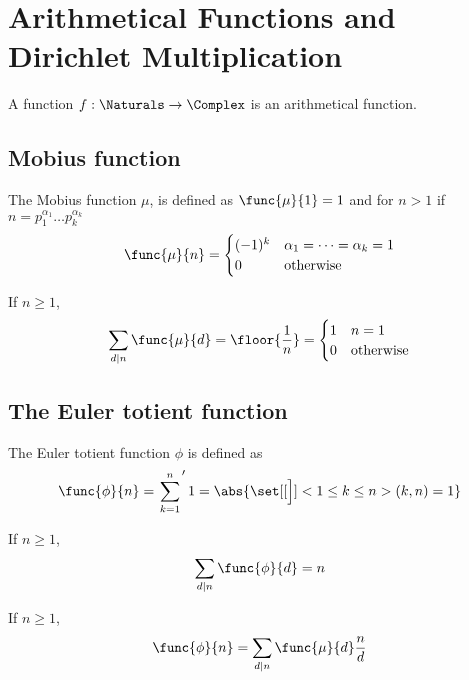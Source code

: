 \chapter{Arithmetical Functions and Dirichlet Multiplication}
\begin{definition}
    A function \(f: \Naturals \to \Complex\) is an arithmetical function.
\end{definition}
\section{Mobius function}
The Mobius function \(\mu\), is defined as \(\func{\mu}{1} = 1\) and for \(n > 1\) if \(n = p_1^{\alpha_1} \dots p_k^{\alpha_k}\)
\begin{equation*}
    \func{\mu}{n} = \begin{cases}
        (-1)^k & \alpha_1 = \dots = \alpha_k = 1\\
        0 & \mathrm{otherwise}
    \end{cases}
\end{equation*}
\begin{theorem}
    If \(n\geq 1\), 
    \begin{equation*}
        \sum_{d \mid n} \func{\mu}{d} = \floor{\frac{1}{n}} = \begin{cases}
            1 & n = 1\\
            0 & \mathrm{otherwise}
        \end{cases}
    \end{equation*}
\end{theorem}
\section{The Euler totient function}
The Euler totient function \(\phi\) is defined as 
\begin{equation*}
    \func{\phi}{n} = \left.\sum_{k  = 1}^n\right.' 1 = \abs{\set[[\Big]]<1 \leq k \leq n>{(k,n) = 1}}
\end{equation*}
\begin{theorem}
    If \(n \geq 1\), 
    \begin{equation*}
        \sum_{d \mid n} \func{\phi}{d} = n 
    \end{equation*}
\end{theorem}

\begin{theorem}
    If \(n \geq 1\), 
    \begin{equation*}
        \func{\phi}{n} = \sum_{d \mid n} \func{\mu}{d} \frac{n}{d}
    \end{equation*}
\end{theorem}

